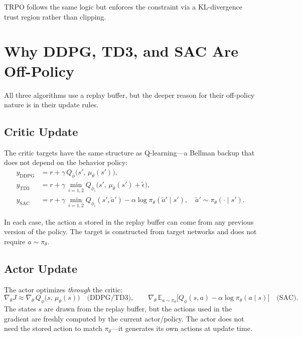 TRPO follows the same logic but enforces the constraint via a KL-divergence trust region rather than clipping.

\section{Why DDPG, TD3, and SAC Are Off-Policy}
\label{sec:offpolicy-ac}

All three algorithms use a replay buffer, but the deeper reason for their off-policy nature is in their update rules.

\subsection{Critic Update}

The critic targets have the same structure as Q-learning---a Bellman backup that does not depend on the behavior policy:
\begin{align}
  y_{\text{DDPG}} &= r + \gamma\, Q_{\bar\phi}\!\bigl(s',\, \mu_{\bar\theta}(s')\bigr), \\
  y_{\text{TD3}}  &= r + \gamma\, \min_{i=1,2} Q_{\bar\phi_i}\!\bigl(s',\, \mu_{\bar\theta}(s') + \tilde\epsilon\bigr), \\
  y_{\text{SAC}}  &= r + \gamma\, \min_{i=1,2} Q_{\bar\phi_i}(s', \tilde{a}') - \alpha\log\pi_\theta(\tilde{a}' \mid s'),
  \quad \tilde{a}' \sim \pi_\theta(\cdot \mid s').
\end{align}

In each case, the action $a$ stored in the replay buffer can come from any previous version of the policy. The target is constructed from target networks and does not require $a \sim \pi_\theta$.

\subsection{Actor Update}

The actor optimizes \emph{through} the critic:
\begin{equation}
  \nabla_\theta J \approx \nabla_\theta\, Q_\phi\!\bigl(s,\, \mu_\theta(s)\bigr)
  \quad\text{(DDPG/TD3)},
  \qquad
  \nabla_\theta\, \mathbb{E}_{a\sim\pi_\theta}\!\bigl[Q_\phi(s,a) - \alpha\log\pi_\theta(a \mid s)\bigr]
  \quad\text{(SAC)}.
\end{equation}
The states $s$ are drawn from the replay buffer, but the actions used in the gradient are freshly computed by the current actor/policy. The actor does not need the stored action to match $\pi_\theta$---it generates its own actions at update time.

